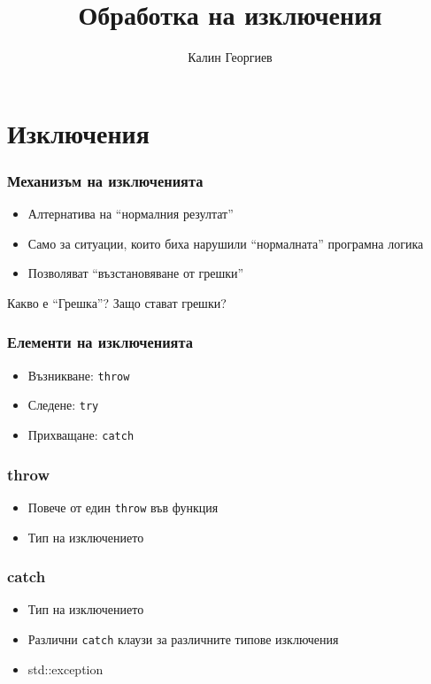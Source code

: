 \documentclass{beamer}
\begin{document}
\title[Обектно-ориентирано програмиране]{Обработка на изключения} 
\author{Калин Георгиев} 
\frame{\titlepage} 


\section{Изключения} 


\begin{frame}[fragile]
  \frametitle{Механизъм на изключенията}

  \begin{itemize}
    \item Алтернатива на ``нормалния резултат''
    \item Само за ситуации, които биха нарушили ``нормалната'' програмна логика
    \item Позволяват ``възстановяване от грешки''
  \end{itemize}

  \bigskip

  Какво е ``Грешка''? Защо стават грешки?
    
  \end{frame}

  
  \begin{frame}[fragile]
    \frametitle{Елементи на изключенията}
  
    \begin{itemize}
      \item Възникване: \texttt{throw}
      \item Следене: \texttt{try}
      \item Прихващане: \texttt{catch}
    \end{itemize}
  \end{frame}
  

\begin{frame}[fragile]
  \frametitle{throw}

  \begin{itemize}
    \item Повече от един \texttt{throw} във функция
    \item Тип на изключението
  \end{itemize}
\end{frame}

\begin{frame}[fragile]
  \frametitle{catch}

  \begin{itemize}
    \item Тип на изключението
    \item Различни \texttt{catch} клаузи за различните типове изключения
    \item std::exception
  \end{itemize}
\end{frame}
\end{document}
